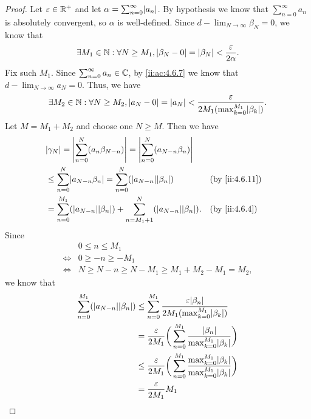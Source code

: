 \begin{proof}
  Let \(\varepsilon \in \mathbb{R}^+\) and let \(\alpha = \sum_{n = 0}^\infty \abs{a_n}\).
  By hypothesis we know that \(\sum_{n = 0}^\infty a_n\) is absolutely convergent, so \(\alpha\) is well-defined.
  Since \(d - \lim_{N \to \infty} \beta_N = 0\), we know that
  \[
    \exists M_1 \in \mathbb{N} : \forall N \geq M_1, \left\lvert\beta_N - 0\right\rvert = \left\lvert\beta_N\right\rvert < \dfrac{\varepsilon}{2 \alpha}.
  \]
  Fix such \(M_1\).
  Since \(\sum_{n = 0}^\infty a_n \in \mathbb{C}\), by \cref{ii:ac:4.6.7} we know that \(d - \lim_{N \to \infty} a_N = 0\).
  Thus, we have
  \[
    \exists M_2 \in \N : \forall N \geq M_2, \abs{a_N - 0} = \abs{a_N} < \dfrac{\varepsilon}{2 M_1 (\max_{k = 0}^{M_1} \abs{\beta_k})}.
  \]
  Let \(M = M_1 + M_2\) and choose one \(N \geq M\).
  Then we have
  \begin{align*}
     & \abs{\gamma_N} = \abs{\sum_{n = 0}^N (a_n \beta_{N - n})} = \abs{\sum_{n = 0}^N (a_{N - n} \beta_n)}                             \\
     & \leq \sum_{n = 0}^N \abs{a_{N - n} \beta_n} = \sum_{n = 0}^N (\abs{a_{N - n}} \abs{\beta_n})                 &  & \by{ii:4.6.11} \\
     & = \sum_{n = 0}^{M_1} (\abs{a_{N - n}} \abs{\beta_n}) + \sum_{n = M_1 + 1}^N (\abs{a_{N - n}} \abs{\beta_n}). &  & \by{ii:4.6.4}
  \end{align*}
  Since
  \begin{align*}
         & 0 \leq n \leq M_1                                     \\
    \iff & 0 \geq -n \geq -M_1                                   \\
    \iff & N \geq N - n \geq N - M_1 \geq M_1 + M_2 - M_1 = M_2,
  \end{align*}
  we know that
  \begin{align*}
    \sum_{n = 0}^{M_1} (\abs{a_{N - n}} \abs{\beta_n}) & \leq \sum_{n = 0}^{M_1} \dfrac{\varepsilon \abs{\beta_n}}{2 M_1 (\max_{k = 0}^{M_1} \abs{\beta_k})}                                       \\
                                                       & = \dfrac{\varepsilon}{2 M_1} \bigg(\sum_{n = 0}^{M_1} \dfrac{\abs{\beta_n}}{\max_{k = 0}^{M_1} \abs{\beta_k}}\bigg)                       \\
                                                       & \leq \dfrac{\varepsilon}{2 M_1} \bigg(\sum_{n = 0}^{M_1} \dfrac{\max_{k = 0}^{M_1} \abs{\beta_k}}{\max_{k = 0}^{M_1} \abs{\beta_k}}\bigg) \\
                                                       & = \dfrac{\varepsilon}{2 M_1} M_1                                                                                                          \\

\end{align*}
\end{proof}

